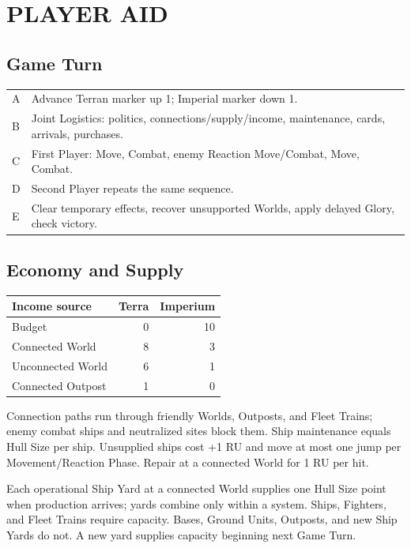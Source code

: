 \clearpage
\section{PLAYER AID}
\small

\subsection{Game Turn}

\begin{tabularx}{\columnwidth}{@{}lX@{}}
\toprule
A & Advance Terran marker up 1; Imperial marker down 1. \\
B & Joint Logistics: politics, connections/supply/income, maintenance, cards,
arrivals, purchases. \\
C & First Player: Move, Combat, enemy Reaction Move/Combat, Move, Combat. \\
D & Second Player repeats the same sequence. \\
E & Clear temporary effects, recover unsupported Worlds, apply delayed Glory,
check victory. \\
\bottomrule
\end{tabularx}

\subsection{Economy and Supply}

\begin{tabularx}{\columnwidth}{@{}Xrr@{}}
\toprule
Income source & Terra & Imperium \\
\midrule
Budget & 0 & 10 \\
Connected World & 8 & 3 \\
Unconnected World & 6 & 1 \\
Connected Outpost & 1 & 0 \\
\bottomrule
\end{tabularx}

Connection paths run through friendly Worlds, Outposts, and Fleet Trains;
enemy combat ships and neutralized sites block them. Ship maintenance equals
Hull Size per ship. Unsupplied ships cost +1 RU and move at most one jump per
Movement/Reaction Phase. Repair at a connected World for 1 RU per hit.

Each operational Ship Yard at a connected World supplies one Hull Size point
when production arrives; yards combine only within a system. Ships, Fighters,
and Fleet Trains require capacity. Bases, Ground Units, Outposts, and new Ship
Yards do not. A new yard supplies capacity beginning next Game Turn.

